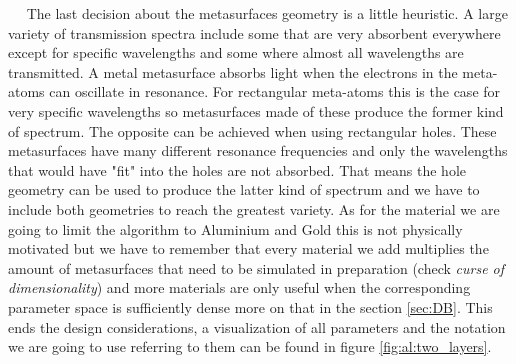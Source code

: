 $\quad$ The last decision about the metasurfaces geometry is a little heuristic. A large variety of transmission spectra include some that are very absorbent everywhere except for specific wavelengths and some where almost all wavelengths are transmitted. A metal metasurface absorbs light when the electrons in the meta-atoms can oscillate in resonance. For rectangular meta-atoms this is the case for very specific wavelengths so metasurfaces made of these produce the former kind of spectrum. The opposite can be achieved when using rectangular holes. These metasurfaces have many different resonance frequencies and only the wavelengths that would have "fit" into the holes are not absorbed. That means the hole geometry can be used to produce the latter kind of spectrum and we have to include both geometries to reach the greatest variety.
As for the material we are going to limit the algorithm to Aluminium and Gold this is not physically motivated but we have to remember that every material we add multiplies the amount of metasurfaces that need to be simulated in preparation (check \textit{curse of dimensionality}) and more materials are only useful when the corresponding parameter space is sufficiently dense more on that in the section \ref{sec:DB}.
This ends the design considerations, a visualization of all parameters and the notation we are going to use referring to them can be found in figure \ref{fig:al:two_layers}.
\\

\newpage
